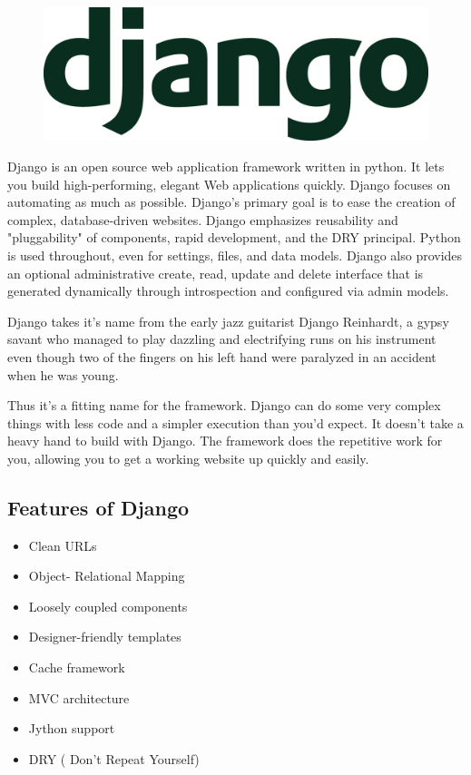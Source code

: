 \begin{figure}[h]
\centering \includegraphics[scale=0.13]{images/django.png}
\end{figure}
\noindent Django is an open source web application framework written in python. It lets 
you build high-performing, elegant Web applications quickly. Django 
focuses on automating as much as possible. Django's primary goal is to 
ease the creation of complex, database-driven websites. Django 
emphasizes reusability and "pluggability" of components, rapid 
development, and the DRY principal. Python is used throughout, even 
for settings, files, and data models. Django also provides an optional
 administrative create, read, update and delete interface that is 
generated dynamically through introspection and configured via admin 
models.

Django takes it's name from the early jazz guitarist Django Reinhardt, 
a gypsy savant who managed to play dazzling and electrifying runs on 
his instrument even though two of the fingers on his left hand were 
paralyzed in an accident when he was young.

Thus it’s a fitting name for the framework. Django can do some very 
complex things with less code and a simpler execution than you’d expect. 
It doesn't take a heavy hand to build with Django. The framework does 
the repetitive work for you, allowing you to get a working website up 
quickly and easily.
\subsection{Features of Django}
\begin{itemize}
\item Clean URLs
\item Object- Relational Mapping
\item Loosely coupled components
\item Designer-friendly templates  
\item Cache framework 
\item MVC architecture
\item Jython support
\item DRY ( Don't Repeat Yourself)
\end{itemize}
